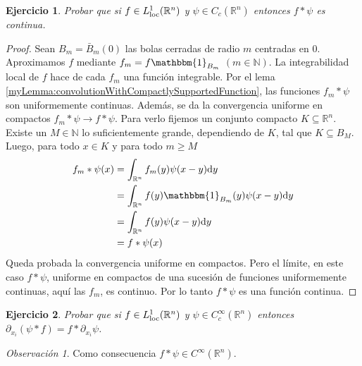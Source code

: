 \documentclass{article}
\newcommand{\characteristic}{\mathbbm{1}}
\newcommand{\naturalNumbers}{\mathbb{N}}
\newcommand{\realNumbers}{\mathbb{R}}
\newcommand{\locallyIntegrableFunctions}{L^1_{\textnormal{loc}}(\realNumbers^n)}
\newcommand{\local}{\textnormal{loc}}
\newtheorem{exercise}{Ejercicio}
\theoremstyle{remark}
\newtheorem{remark}{Observación}
\begin{document}
\begin{exercise}
  Probar que si \(f \in L^1_{\local}(\realNumbers^n)\) y \(\psi \in C_c(\realNumbers^n)\) entonces \(f * \psi\) es continua.
\end{exercise}
\begin{proof}
  Sean \(B_m = \bar{B}_m(0)\) las bolas cerradas de radio \(m\) centradas en \(0\).
  Aproximamos \(f\) mediante \(f_m = f \characteristic_{B_m}\) \((m \in \naturalNumbers)\).
  La integrabilidad local de \(f\) hace de cada \(f_m\) una función integrable.
  Por el lema \ref{myLemma:convolutionWithCompactlySupportedFunction}, las funciones \(f_m * \psi\) son uniformemente continuas.
  Además, se da la convergencia uniforme en compactos \(f_m * \psi \rightarrow f * \psi\).
  Para verlo fijemos un conjunto compacto \(K \subseteq \realNumbers^n\).
  Existe un \(M \in \naturalNumbers\) lo suficientemente grande, dependiendo de \(K\), tal que \(K \subseteq B_M\).
  Luego, para todo \(x \in K\) y para todo \(m \geq M\)
  \begin{align}
    f_m * \psi (x)
    &=
    \int_{\realNumbers^n} f_m (y) \psi(x - y) \dd y
    \\
    &=
    \int_{\realNumbers^n} f (y) \characteristic_{B_m} (y) \psi(x - y) \dd y
    \\
    &=
    \int_{\realNumbers^n} f (y) \psi(x - y) \dd y
    \\
    &=
    f * \psi (x)
  \end{align}
  Queda probada la convergencia uniforme en compactos.
  Pero el límite, en este caso \(f * \psi\), uniforme en compactos de una sucesión de funciones uniformemente continuas, aquí las \(f_m\), es continuo.
  Por lo tanto \(f * \psi\) es una función continua.
\end{proof}

\begin{exercise}
  Probar que si \(f \in \locallyIntegrableFunctions\) y \(\psi \in C^{\infty}_c(\realNumbers^n)\) entonces \(\partial_{x_i} (\psi * f) = f * \partial_{x_i} \psi\).
\end{exercise}
\begin{remark}
  Como consecuencia \(f * \psi \in C^{\infty}(\realNumbers^n)\).
\end{remark}
\end{document}
